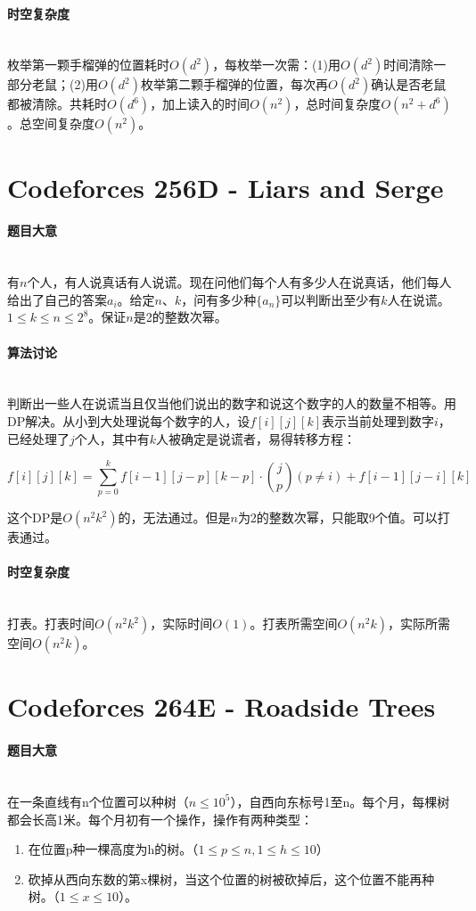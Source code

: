 \documentclass[UTF8]{ctexart}
\newcommand{\myparagraph}[1]{\paragraph{#1}\mbox{}\\}
\theoremstyle{nonumberplain}
\begin{document}
		\myparagraph{时空复杂度}
		
			枚举第一颗手榴弹的位置耗时$O(d^2)$，每枚举一次需：(1)用$O(d^2)$时间清除一部分老鼠；(2)用$O(d^2)$枚举第二颗手榴弹的位置，每次再$O(d^2)$确认是否老鼠都被清除。共耗时$O(d^6)$，加上读入的时间$O(n^2)$，总时间复杂度$O(n^2+d^6)$。总空间复杂度$O(n^2)$。
	
	\section{Codeforces 256D - Liars and Serge}
	
		\myparagraph{题目大意}
		
			有$n$个人，有人说真话有人说谎。现在问他们每个人有多少人在说真话，他们每人给出了自己的答案$a_i$。给定$n$、$k$，问有多少种$\{a_n\}$可以判断出至少有$k$人在说谎。$1 \leq k \leq n \leq 2^8$。保证$n$是2的整数次幂。
		
		\myparagraph{算法讨论}
		
			判断出一些人在说谎当且仅当他们说出的数字和说这个数字的人的数量不相等。用DP解决。从小到大处理说每个数字的人，设$f[i][j][k]$表示当前处理到数字$i$，已经处理了$j$个人，其中有$k$人被确定是说谎者，易得转移方程：
			
			$$f[i][j][k]=\sum_{p=0}^k f[i-1][j-p][k-p] \cdot \binom{j}{p} (p\not=i) + f[i-1][j-i][k]$$
			
			这个DP是$O(n^2k^2)$的，无法通过。但是$n$为2的整数次幂，只能取9个值。可以打表通过。
		
		\myparagraph{时空复杂度}
		
			打表。打表时间$O(n^2k^2)$，实际时间$O(1)$。打表所需空间$O(n^2k)$，实际所需空间$O(n^2k)$。
	
	\section{Codeforces 264E - Roadside Trees}
	
		\myparagraph{题目大意}
		
			在一条直线有n个位置可以种树（$n \leq 10^5$），自西向东标号1至n。每个月，每棵树都会长高1米。每个月初有一个操作，操作有两种类型：
			
			\begin{enumerate}
				\item 在位置p种一棵高度为h的树。（$1 \leq p \leq n, 1 \leq h \leq 10$）
				\item 砍掉从西向东数的第x棵树，当这个位置的树被砍掉后，这个位置不能再种树。（$1 \leq x \leq 10$）。
			\end{enumerate}
			
\end{document}
